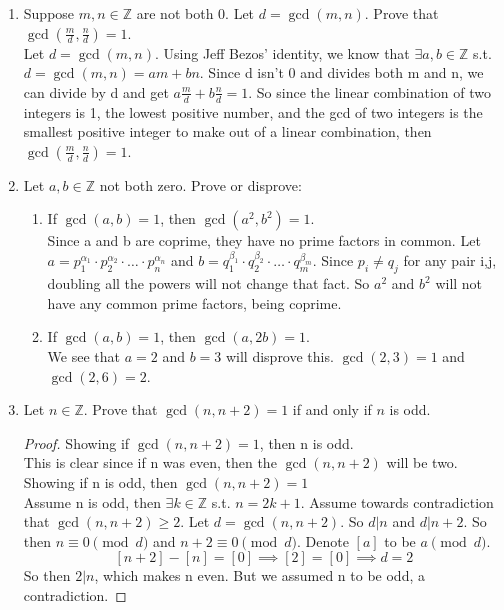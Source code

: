 \documentclass[12pt]{article}
\newcommand{\Z}{\mathbb{Z}}
\begin{document}
\begin{enumerate}
	
\medskip
\item Suppose $m,n \in \mathbb{Z}$ are not both 0.  Let $d = \gcd(m,n)$.  Prove that $\gcd(\frac{m}{d}, \frac{n}{d}) = 1$.\medskip\\

Let $d=\gcd(m,n)$. Using Jeff Bezos' identity, we know that $\exists a,b\in\Z$ s.t. $d=\gcd(m,n)=am+bn$. Since d isn't 0 and divides both m and n, we can divide by d and get $a\frac{m}{d}+b\frac{n}{d}=1$. So since the linear combination of two integers is 1, the lowest positive number, and the gcd of two integers is the smallest positive integer to make out of a linear combination, then $\gcd(\frac{m}{d},\frac{n}{d}) = 1$.


\medskip
\item Let $a, b \in \mathbb{Z}$ not both zero.  Prove or disprove:
	\begin{enumerate}
	\item If $\gcd(a,b) = 1$, then $\gcd(a^2, b^2) = 1$.\medskip\\
	Since a and b are coprime, they have no prime factors in common. Let $a=p_1^{\alpha_1}\cdot p_2^{\alpha_2}\cdot\ldots\cdot p_n^{\alpha_n}$ and $b=q_1^{\beta_1}\cdot q_2^{\beta_2}\cdot\ldots\cdot q_m^{\beta_m}$. Since $p_i\neq q_j$ for any pair i,j, doubling all the powers will not change that fact. So $a^2$ and $b^2$ will not have any common prime factors, being coprime. \qedsymbol
	\item If $\gcd(a,b) = 1$, then $\gcd(a,2b) = 1$.\medskip\\
	We see that $a=2$ and $b=3$ will disprove this. $\gcd(2,3)=1$ and $\gcd(2,6)=2$. 
	\end{enumerate}


\medskip
\item Let $n \in \mathbb{Z}$.  Prove that $\gcd(n,n+2) = 1$ if and only if $n$ is odd.
\begin{proof}
	Showing if $\gcd(n,n+2)=1$, then n is odd.\\
	This is clear since if n was even, then the $\gcd(n,n+2)$ will be two.\\
	Showing if n is odd, then $\gcd(n,n+2)=1$\\
	Assume n is odd, then $\exists k\in\Z$ s.t. $n = 2k+1$. Assume towards contradiction that $\gcd(n,n+2)\geq2$. Let $d=\gcd(n,n+2)$. So $d|n$ and $d|n+2$.
	So then $n\equiv 0 \pmod d$ and $n+2 \equiv 0 \pmod d$. Denote $[a]$ to be $a\pmod d$.
	\[[n+2]-[n]=[0] \implies [2]=[0] \implies d=2\]
	So then $2|n$, which makes n even. But we assumed n to be odd, a contradiction.
\end{proof}


\end{enumerate}
\end{document}
